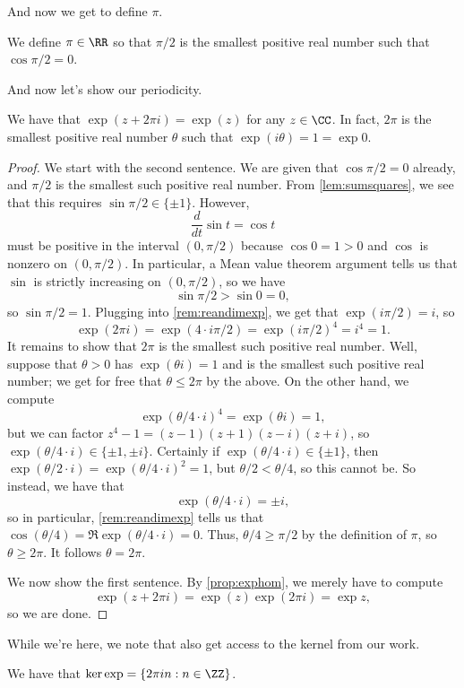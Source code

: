 And now we get to define $\pi$.
\begin{defihelper}[\texorpdfstring{$\pi$}{pi}] 
	We define $\pi\in\RR$ so that $\pi/2$ is the smallest positive real number such that $\cos\pi/2=0$.
\end{defihelper}
And now let's show our periodicity.
\begin{lemma} \label{lem:expperiod}
	We have that $\exp(z+2\pi i)=\exp(z)$ for any $z\in\CC$. In fact, $2\pi$ is the smallest positive real number $\theta$ such that $\exp(i\theta)=1=\exp0$.
\end{lemma}
\begin{proof}
	We start with the second sentence. We are given that $\cos\pi/2=0$ already, and $ \pi/2$ is the smallest such positive real number. From \autoref{lem:sumsquares}, we see that this requires $\sin \pi/2\in\{\pm1\}$. However,
	\[\frac d{dt}\sin t=\cos t\]
	must be positive in the interval $(0, \pi/2)$ because $\cos0=1>0$ and $\cos$ is nonzero on $(0, \pi/2)$. In particular, a Mean value theorem argument tells us that $\sin$ is strictly increasing on $(0, \pi/2)$, so we have
	\[\sin \pi/2>\sin0=0,\]
	so $\sin \pi/2=1$. Plugging into \autoref{rem:reandimexp}, we get that $\exp(i\pi/2)=i$, so
	\[\exp(2\pi i)=\exp(4\cdot i\pi/2)=\exp(i\pi/2)^4=i^4=1.\]
	It remains to show that $2\pi$ is the smallest such positive real number. Well, suppose that $\theta>0$ has $\exp(\theta i)=1$ and is the smallest such positive real number; we get for free that $\theta\le2\pi$ by the above. On the other hand, we compute
	\[\exp(\theta/4\cdot i)^4=\exp(\theta i)=1,\]
	but we can factor $z^4-1=(z-1)(z+1)(z-i)(z+i)$, so $\exp(\theta/4\cdot i)\in\{\pm1,\pm i\}$. Certainly if $\exp(\theta/4\cdot i)\in\{\pm1\}$, then $\exp(\theta/2\cdot i)=\exp(\theta/4\cdot i)^2=1$, but $\theta/2<\theta/4$, so this cannot be. So instead, we have that
	\[\exp(\theta/4\cdot i)=\pm i,\]
	so in particular, \autoref{rem:reandimexp} tells us that $\cos(\theta/4)=\Re\exp(\theta/4\cdot i)=0$. Thus, $\theta/4\ge\pi/2$ by the definition of $\pi$, so $\theta\ge2\pi$. It follows $\theta=2\pi$.

	We now show the first sentence. By \autoref{prop:exphom}, we merely have to compute
	\[\exp(z+2\pi i)=\exp(z)\exp(2\pi i)=\exp z,\]
	so we are done.
\end{proof}
While we're here, we note that also get access to the kernel from our work.
\begin{prop} \label{prop:expker}
	We have that $\ker\exp=\{2\pi in:n\in\ZZ\}$.
\end{prop}
